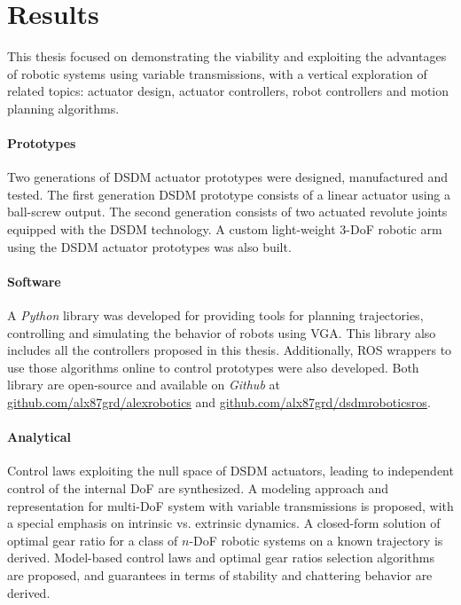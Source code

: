 \newpage

\section{Results}
\label{sec:mainresults}


This thesis focused on demonstrating the viability and exploiting the advantages of robotic systems using variable transmissions, with a vertical exploration of related topics: actuator design, actuator controllers, robot controllers and motion planning algorithms.

\paragraph{Prototypes}
%
Two generations of DSDM actuator prototypes were designed, manufactured and tested. The first generation DSDM prototype consists of a linear actuator using a ball-screw output. The second generation consists of two actuated revolute joints equipped with the DSDM technology. A custom light-weight 3-DoF robotic arm using the DSDM actuator prototypes was also built. %

\paragraph{Software}
%
A \emph{Python} library was developed for providing tools for planning trajectories, controlling and simulating the behavior of robots using VGA. This library also includes all the controllers proposed in this thesis. Additionally, ROS wrappers to use those algorithms online to control prototypes were also developed. Both library are open-source and available on \emph{Github} at \href{https://github.com/alx87grd/alexrobotics}{github.com/alx87grd/alexrobotics} and \href{https://github.com/alx87grd/dsdm_robotics_ros}{github.com/alx87grd/dsdm\textunderscore robotics\textunderscore ros}.

\paragraph{Analytical}
%
Control laws exploiting the null space of DSDM actuators, leading to independent control of the internal DoF are synthesized. A modeling approach and representation for multi-DoF system with variable transmissions is proposed, with a special emphasis on intrinsic vs. extrinsic dynamics. A closed-form solution of optimal gear ratio for a class of $n$-DoF robotic systems on a known trajectory is derived. Model-based control laws and optimal gear ratios selection algorithms are proposed, and guarantees in terms of stability and chattering behavior are derived.

